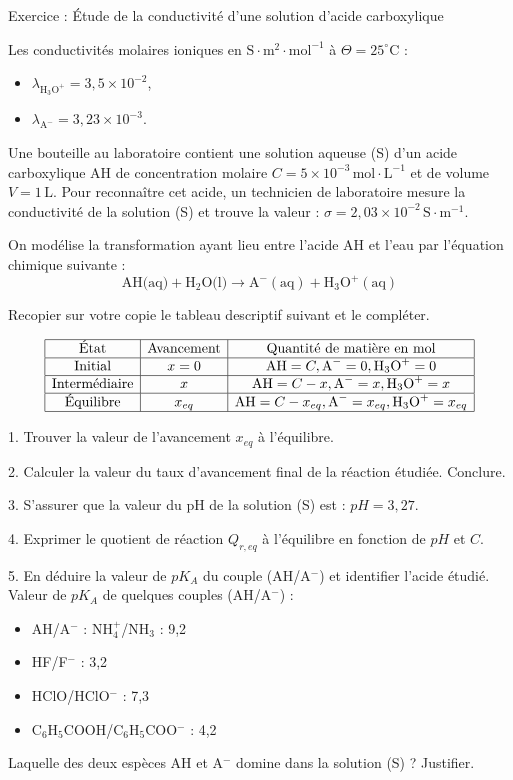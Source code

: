 \documentclass[12pt, french]{article}
\begin{document}
\begin{Box2}{Exercice : Étude de la conductivité d'une solution d'acide carboxylique}

Les conductivités molaires ioniques en $\text{S} \cdot \text{m}^2 \cdot \text{mol}^{-1}$ à $\Theta = 25^\circ \text{C}$ :
\begin{itemize}
    \item $\lambda_{\text{H}_3\text{O}^+} = 3,5 \times 10^{-2}$,
    \item $\lambda_{\text{A}^-} = 3,23 \times 10^{-3}$.
\end{itemize}

Une bouteille au laboratoire contient une solution aqueuse (S) d’un acide carboxylique AH de concentration molaire $C = 5 \times 10^{-3} \, \text{mol} \cdot \text{L}^{-1}$ et de volume $V = 1 \, \text{L}$.  
Pour reconnaître cet acide, un technicien de laboratoire mesure la conductivité de la solution (S) et trouve la valeur : $\sigma = 2,03 \times 10^{-2} \, \text{S} \cdot \text{m}^{-1}$.

On modélise la transformation ayant lieu entre l’acide AH et l’eau par l’équation chimique suivante :
\[
\text{AH(aq)} + \text{H}_2\text{O(l)} \longrightarrow \text{A}^- (\text{aq}) + \text{H}_3\text{O}^+ (\text{aq})
\]

Recopier sur votre copie le tableau descriptif suivant et le compléter.

\[
\begin{array}{|c|c|c|c|}
\hline
\text{État} & \text{Avancement} & \text{Quantité de matière en mol} \\
\hline
\text{Initial} & x = 0 & \text{AH} = C, \text{A}^- = 0, \text{H}_3\text{O}^+ = 0 \\
\hline
\text{Intermédiaire} & x & \text{AH} = C - x, \text{A}^- = x, \text{H}_3\text{O}^+ = x \\
\hline
\text{Équilibre} & x_{eq} & \text{AH} = C - x_{eq}, \text{A}^- = x_{eq}, \text{H}_3\text{O}^+ = x_{eq} \\
\hline
\end{array}
\]

1. Trouver la valeur de l’avancement $x_{eq}$ à l’équilibre.

2. Calculer la valeur du taux d’avancement final de la réaction étudiée. Conclure.

3. S’assurer que la valeur du pH de la solution (S) est : $pH = 3,27$.

4. Exprimer le quotient de réaction $Q_{r,eq}$ à l’équilibre en fonction de $pH$ et $C$.

5. En déduire la valeur de $pK_A$ du couple (AH/A$^-$) et identifier l’acide étudié.  
Valeur de $pK_A$ de quelques couples (AH/A$^-$) :
\begin{itemize}
    \item AH/A$^-$ : NH$_4^+$/NH$_3$ : 9,2
    \item HF/F$^-$ : 3,2
    \item HClO/HClO$^-$ : 7,3
    \item C$_6$H$_5$COOH/C$_6$H$_5$COO$^-$ : 4,2
\end{itemize}

Laquelle des deux espèces AH et A$^-$ domine dans la solution (S) ? Justifier.

\end{Box2}
\end{document}
